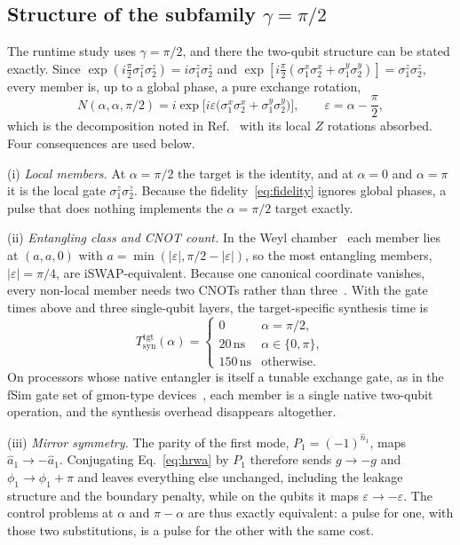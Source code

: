 \documentclass[aps,prx,twocolumn,superscriptaddress,nofootinbib,amsmath,amssymb,floatfix]{revtex4-2}
\newcommand{\Ntgt}[2]{N(#1,#1,#2)}
\newcommand{\Tsyn}{T_{\mathrm{syn}}}
\newcommand{\ns}{\,\mathrm{ns}}
\begin{document}
\subsection{Structure of the subfamily $\gamma=\pi/2$}
\label{sec:structure}

The runtime study uses $\gamma=\pi/2$, and there the two-qubit structure can be stated exactly. Since
$\exp(i\tfrac{\pi}{2}\sigma^z_1\sigma^z_2)=i\sigma^z_1\sigma^z_2$ and
$\exp[i\tfrac{\pi}{2}(\sigma^x_1\sigma^x_2+\sigma^y_1\sigma^y_2)]=\sigma^z_1\sigma^z_2$, every member is,
up to a global phase, a pure exchange rotation,
\begin{equation}
\Ntgt{\alpha}{\pi/2}=i\exp\!\bigl[i\varepsilon\bigl(\sigma_1^x\sigma_2^x+\sigma_1^y\sigma_2^y\bigr)\bigr],
\qquad \varepsilon=\alpha-\frac{\pi}{2},
\label{eq:exchange}
\end{equation}
which is the decomposition noted in Ref.~\cite{Niu2019} with its local $Z$ rotations absorbed. Four
consequences are used below.

(i) \emph{Local members.} At $\alpha=\pi/2$ the target is the identity, and at $\alpha=0$ and
$\alpha=\pi$ it is the local gate $\sigma^z_1\sigma^z_2$. Because the fidelity~\eqref{eq:fidelity}
ignores global phases, a pulse that does nothing implements the $\alpha=\pi/2$ target exactly.

(ii) \emph{Entangling class and CNOT count.} In the Weyl chamber~\cite{Zhang2003} each member lies at
$(a,a,0)$ with $a=\min(|\varepsilon|,\pi/2-|\varepsilon|)$, so the most entangling members,
$|\varepsilon|=\pi/4$, are iSWAP-equivalent. Because one canonical coordinate vanishes, every non-local
member needs two CNOTs rather than three~\cite{VidalDawson2004,ShendeMarkovBullock2004}. With the gate
times above and three single-qubit layers, the target-specific synthesis time is
\begin{equation}
\Tsyn^{\mathrm{tgt}}(\alpha)=
\begin{cases}
0 & \alpha=\pi/2,\\
20\ns & \alpha\in\{0,\pi\},\\
150\ns & \text{otherwise}.
\end{cases}
\label{eq:tsyntgt}
\end{equation}
On processors whose native entangler is itself a tunable exchange gate, as in the fSim gate set of
gmon-type devices~\cite{Foxen2020}, each member is a single native two-qubit operation, and the
synthesis overhead disappears altogether.

(iii) \emph{Mirror symmetry.} The parity of the first mode, $P_1=(-1)^{\hat n_1}$, maps
$\hat a_1\to-\hat a_1$. Conjugating Eq.~\eqref{eq:hrwa} by $P_1$ therefore sends $g\to-g$ and
$\phi_1\to\phi_1+\pi$ and leaves everything else unchanged, including the leakage structure and the
boundary penalty, while on the qubits it maps $\varepsilon\to-\varepsilon$. The control problems at
$\alpha$ and $\pi-\alpha$ are thus exactly equivalent: a pulse for one, with those two substitutions,
is a pulse for the other with the same cost.
\end{document}
